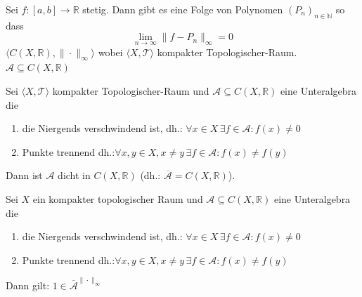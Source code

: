{
    Sei $f:[a,b] \to \mathbb{R}$ stetig. Dann gibt es eine Folge von Polynomen
    $(P_n)_{n \in \mathbb{N}}$ so dass 
    $$
    \lim_{n \to \infty} \|f - P_n\|_{\infty} = 0
    $$
    $\langle C(X,\mathbb{R}), \|\cdot\|_{\infty}\rangle$ wobei 
    $\langle X, \mathcal{T} \rangle$ kompakter Topologischer-Raum. \\
    $\mathcal{A}\subseteq C(X,\mathbb{R})$
}

{
    Sei $\langle X, \mathcal{T} \rangle$ kompakter Topologischer-Raum und 
    $\mathcal{A} \subseteq C(X,\mathbb{R})$ eine Unteralgebra die
    \begin{enumerate}
        \item die Niergends verschwindend ist, dh.: $\forall x \in X \, \exists f \in \mathcal{A}: f(x) \neq 0$
        \item Punkte trennend 
        dh.:$ \forall x,y \in X, x \neq y \, \exists f \in \mathcal{A}: f(x) \neq f(y)$
    \end{enumerate}
    Dann ist $\mathcal{A}$ dicht in $C(X,\mathbb{R})$ 
    (dh.: $\overline{\mathcal{A}} = C(X,\mathbb{R})$).
}

\mlenma{}
{
    Sei $X$ ein kompakter topologischer Raum und 
    $\mathcal{A} \subseteq C(X,\mathbb{R})$ eine Unteralgebra die 
    \begin{enumerate}
        \item die Niergends verschwindend ist, dh.: $\forall x \in X \, \exists f \in \mathcal{A}: f(x) \neq 0$
        \item Punkte trennend 
        dh.:$ \forall x,y \in X, x \neq y \, \exists f \in \mathcal{A}: f(x) \neq f(y)$
    \end{enumerate}
    Dann gilt: $1 \in \overline{\mathcal{A}}^{\|\cdot\|_{\infty}}$
}

